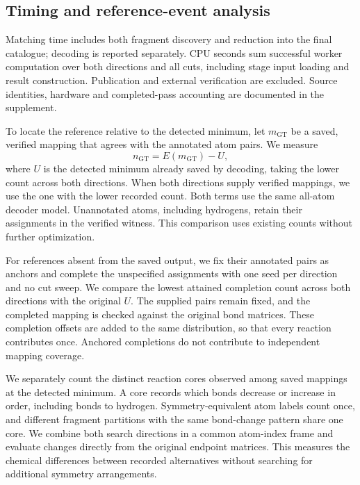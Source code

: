 \subsection{Timing and reference-event analysis}
\label{sec:measurement}

Matching time includes both fragment discovery and reduction into the final catalogue; decoding is reported separately. CPU seconds sum successful worker computation over both directions and all cuts, including stage input loading and result construction. Publication and external verification are excluded. Source identities, hardware and completed-pass accounting are documented in the supplement.

To locate the reference relative to the detected minimum, let $m_{\mathrm{GT}}$ be a saved, verified mapping that agrees with the annotated atom pairs. We measure
\begin{equation}
 n_{\mathrm{GT}}=E(m_{\mathrm{GT}})-U,
 \label{eq:reference-offset}
\end{equation}
where $U$ is the detected minimum already saved by decoding, taking the lower count across both directions. When both directions supply verified mappings, we use the one with the lower recorded count. Both terms use the same all-atom decoder model. Unannotated atoms, including hydrogens, retain their assignments in the verified witness. This comparison uses existing counts without further optimization.

For references absent from the saved output, we fix their annotated pairs as anchors and complete the unspecified assignments with one seed per direction and no cut sweep. We compare the lowest attained completion count across both directions with the original $U$. The supplied pairs remain fixed, and the completed mapping is checked against the original bond matrices. These completion offsets are added to the same distribution, so that every reaction contributes once. Anchored completions do not contribute to independent mapping coverage.

We separately count the distinct reaction cores observed among saved mappings at the detected minimum. A core records which bonds decrease or increase in order, including bonds to hydrogen. Symmetry-equivalent atom labels count once, and different fragment partitions with the same bond-change pattern share one core. We combine both search directions in a common atom-index frame and evaluate changes directly from the original endpoint matrices. This measures the chemical differences between recorded alternatives without searching for additional symmetry arrangements.

